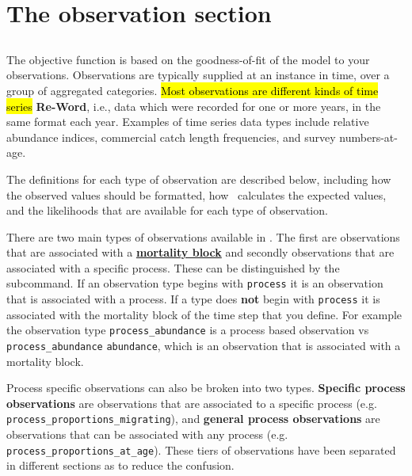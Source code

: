 \section{The observation section\label{sec:observation-section}}

\subsection{\label{sec:Observations}}

The objective function is based on the goodness-of-fit of the model to your observations. Observations are typically supplied at an instance in time, over a group of aggregated categories. \hl{Most observations are different kinds of time series} \textbf{Re-Word}, i.e., data which were recorded for one or more years, in the same format each year. Examples of time series data types include relative abundance indices, commercial catch length frequencies, and survey numbers-at-age.

The definitions for each type of observation are described below, including how the observed values should be formatted, how \CNAME\ calculates the expected values, and the likelihoods that are available for each type of observation.

There are two main types of observations available in \CNAME. The first are observations that are associated with a \hyperref[sec:mortality_block]{\textbf{mortality block}} and secondly observations that are associated with a specific process. These can be distinguished by the  subcommand. If an observation type begins with \texttt{process} it is an observation that is associated with a process. If a type does \textbf{not} begin with \texttt{process} it is associated with the mortality block of the time step that you define. For example the observation type \texttt{process\_abundance} is a process based observation vs \texttt{process\_abundance} \texttt{abundance}, which is an observation that is associated with a mortality block.

Process specific observations can also be broken into two types. \textbf{Specific process observations} are observations that are associated to a specific process (e.g. \texttt{process\_proportions\_migrating}), and \textbf{general process observations} are observations that can be associated with any process (e.g. \texttt{process\_proportions\_at\_age}). These tiers of observations have been separated in different sections as to reduce the confusion.

